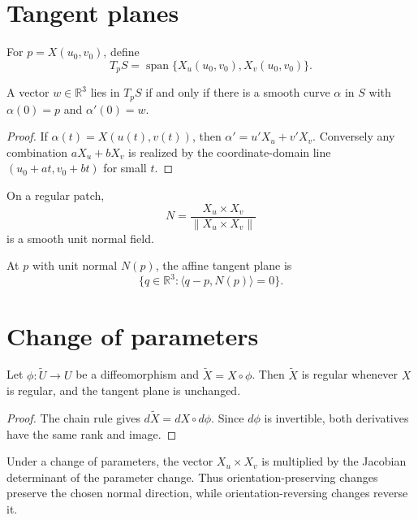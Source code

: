 \section{Tangent planes}
\begin{definition}\label{def:vii14-tangent-plane}
For \(p=X(u_0,v_0)\), define
\[
T_pS=\operatorname{span}\{X_u(u_0,v_0),X_v(u_0,v_0)\}.
\]
\end{definition}

\begin{theorem}\label{thm:vii14-curve-tangent}
A vector \(w\in\mathbb R^3\) lies in \(T_pS\) if and only if there is a smooth curve \(\alpha\) in \(S\) with \(\alpha(0)=p\) and \(\alpha'(0)=w\).
\end{theorem}
\begin{proof}
If \(\alpha(t)=X(u(t),v(t))\), then \(\alpha'=u'X_u+v'X_v\).  Conversely any combination \(aX_u+bX_v\) is realized by the coordinate-domain line \((u_0+at,v_0+bt)\) for small \(t\).
\end{proof}

\begin{definition}\label{def:vii14-unit-normal}
On a regular patch,
\[
N=\frac{X_u\times X_v}{\|X_u\times X_v\|}
\]
is a smooth unit normal field.
\end{definition}

\begin{proposition}\label{prop:vii14-plane-equation}
At \(p\) with unit normal \(N(p)\), the affine tangent plane is
\[
\{q\in\mathbb R^3:\langle q-p,N(p)\rangle=0\}.
\]
\end{proposition}

\section{Change of parameters}
\begin{theorem}[Reparametrization]\label{thm:vii14-reparam}
Let \(\phi:\widetilde U\to U\) be a diffeomorphism and \(\widetilde X=X\circ\phi\).  Then \(\widetilde X\) is regular whenever \(X\) is regular, and the tangent plane is unchanged.
\end{theorem}
\begin{proof}
The chain rule gives \(d\widetilde X=dX\circ d\phi\).  Since \(d\phi\) is invertible, both derivatives have the same rank and image.
\end{proof}

\begin{proposition}\label{prop:vii14-normal-change}
Under a change of parameters, the vector \(X_u\times X_v\) is multiplied by the Jacobian determinant of the parameter change.  Thus orientation-preserving changes preserve the chosen normal direction, while orientation-reversing changes reverse it.
\end{proposition}

